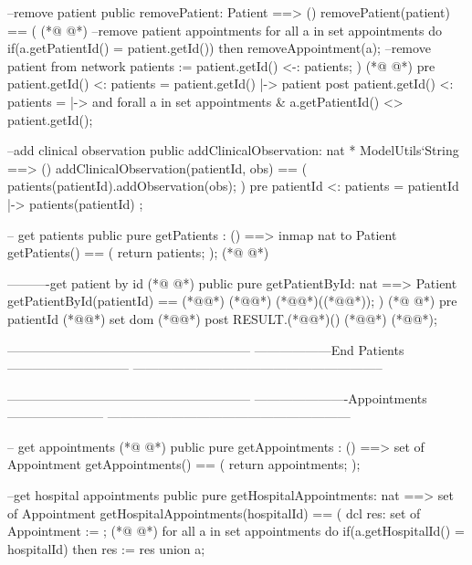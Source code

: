 \begin{vdmpp}[breaklines=true]
  --remove patient
  public removePatient: Patient ==> ()
  removePatient(patient) == (
(*@
\label{addClinicalObservation:248}
@*)
   --remove patient appointments
   for all a in set appointments do 
    if(a.getPatientId() = patient.getId()) then
     removeAppointment(a);
   --remove patient from network
   patients := {patient.getId()} <-: patients;
  )
(*@
\label{getPatients:255}
@*)
   pre {patient.getId()} <: patients = { patient.getId() |-> patient } 
  post {patient.getId()} <: patients = { |-> } and forall a in set appointments & a.getPatientId() <> patient.getId();
   
  --add clinical observation
  public addClinicalObservation: nat * ModelUtils`String ==> ()
  addClinicalObservation(patientId, obs) == (
   patients(patientId).addObservation(obs);
  )
   pre {patientId} <: patients = { patientId |-> patients(patientId) } ;
   
   -- get patients
  public pure getPatients : () ==> inmap nat to Patient
  getPatients() == (
   return patients;
  );
(*@
\label{getAppointments:270}
@*)
  
  ----------get patient by id
(*@
\label{getPatientById:272}
@*)
  public pure getPatientById: nat ==> Patient
   getPatientById(patientId) == (*@\vdmnotcovered{(}@*)
    (*@@*) (*@@*)((*@@*));
   )
(*@
\label{getHospitalAppointments:276}
@*)
  pre patientId (*@@*) set dom (*@@*)
  post RESULT.(*@@*)() (*@\vdmnotcovered{=}@*) (*@@*);
  
  
  ---------------------------------------------------------
  ------------------End Patients-----------------------------
  -----------------------------------------------------------

  ---------------------------------------------------------
  ----------------------Appointments-----------------------
  ---------------------------------------------------------
  
  -- get appointments
(*@
\label{getHospitalNumberOfAppointments:289}
@*)
  public pure getAppointments : () ==> set of Appointment
  getAppointments() == (
   return appointments;
  );
  
  --get hospital appointments
  public pure getHospitalAppointments: nat ==> set of Appointment
  getHospitalAppointments(hospitalId) == (
   dcl res: set of Appointment := {};
(*@
\label{getDoctorAppointments:298}
@*)
   for all a in set appointments do 
    if(a.getHospitalId() = hospitalId) then
      res := res union {a}; 
  

\end{vdmpp}
